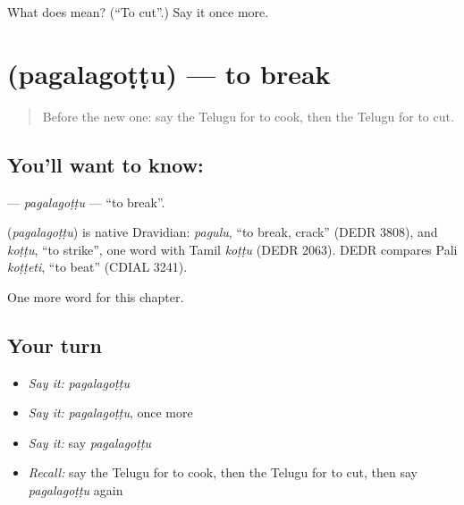 \begin{tcolorbox}[breakable,colback=teal!4,colframe=teal!35!black,title={Before you move on}]
What does  mean? (\textquotedblleft{}To cut\textquotedblright{}.) Say it once more.
\end{tcolorbox}
\section[\texorpdfstring{\te{పగలగొట్టు} (pagalagoṭṭu)}{పగలగొట్టు (pagalagoṭṭu)}]{ (pagalagoṭṭu) — to break}

\label{lesson:TE-C144-pagalagottu}



\begin{quote}
Before the new one: say the Telugu for to cook, then the Telugu for to cut.
\end{quote}

\subsection*{You'll want to know: }
\textbf{} — \emph{pagalagoṭṭu} — \textquotedblleft{}to break\textquotedblright{}.

\begin{cousinweb}
\textbf{} (\emph{pagalagoṭṭu}) is native Dravidian: \emph{pagulu}, \textquotedblleft{}to break, crack\textquotedblright{} (DEDR 3808), and \emph{koṭṭu}, \textquotedblleft{}to strike\textquotedblright{}, one word with Tamil \emph{koṭṭu} (DEDR 2063). DEDR compares Pali \emph{koṭṭeti}, \textquotedblleft{}to beat\textquotedblright{} (CDIAL 3241).
\end{cousinweb}

\begin{grammarlens}[title={What you've built}]
One more word for this chapter.
\end{grammarlens}

\subsection*{Your turn}
\begin{itemize}
\raggedright
  \item \emph{Say it:} \emph{pagalagoṭṭu}
  \item \emph{Say it:} \emph{pagalagoṭṭu}, once more
  \item \emph{Say it:} say \emph{pagalagoṭṭu}
  \item \emph{Recall:} say the Telugu for to cook, then the Telugu for to cut, then say \emph{pagalagoṭṭu} again
\end{itemize}

